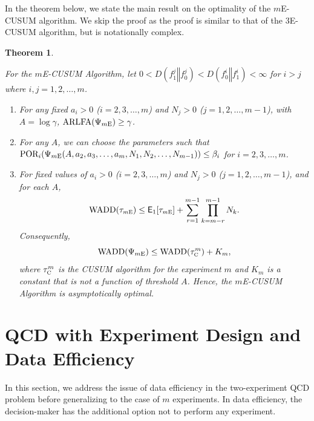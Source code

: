 \documentclass[journal, onecolumn]{IEEEtran}
\newtheorem{theorem}{Theorem}
\begin{document}
\medskip

In the theorem below, we state the main result on the optimality of the $m$E-CUSUM algorithm. We skip the proof as the proof is similar to that of the 3E-CUSUM algorithm, but is notationally complex. 

\begin{theorem}
\label{thm:me}

For the \textup{$m$E-CUSUM} Algorithm, let $0 < D(f_1^j \mathrel{\Vert} f_0^j) < D(f_0^i \mathrel{\Vert} f_1^i) < \infty$ for $i > j$ where $i, j = 1, 2, \dots, m$.

\begin{enumerate}
\item For any fixed $a_i > 0$ ($i = 2, 3, \dots, m$) and $N_j > 0$ ($j = 1, 2, \dots, m - 1$), with $A = \log \gamma$, $\textup{ARLFA} (\Psi_{\textup{$m$E}}) \geq \gamma$.

\item For any $A$, we can choose the parameters such that
$ \textup{POR}_i (\Psi_{\textup{$m$E}} (A, a_2, a_3, \dots, a_m, N_1, N_2, \dots, N_{m - 1})) \leq \beta_i $
for $i = 2, 3, \dots, m$.

\item For fixed values of $a_i > 0$ ($i = 2, 3, \dots, m$) and $N_j > 0$ ($j = 1, 2, \dots, m - 1$), and for each $A$,
$$ \textup{WADD} (\tau_{\textup{\fontsize{6 pt}{10 pt}\selectfont $m$E}}) \leq \mathsf{E}_1 [\tau_{\textup{\fontsize{6 pt}{10 pt}\selectfont $m$E}}] + \sum_{r = 1}^{m - 1} \prod_{k = m - r}^{m - 1} N_k. $$
Consequently,
$$ \textup{WADD} (\Psi_{\textup{$m$E}}) \leq \textup{WADD} (\tau_{\textup{\fontsize{6 pt}{10 pt}\selectfont C}}^m) + K_m, $$
where $\tau_{\textup{\fontsize{6 pt}{10 pt}\selectfont C}}^m$ is the \textup{CUSUM} algorithm for the experiment $m$ and $K_m$ is a constant that is not a function of threshold $A$. Hence, the \textup{$m$E-CUSUM} Algorithm is asymptotically optimal.
\end{enumerate}

\end{theorem}




\clearpage

\section{QCD with Experiment Design and Data Efficiency}
\label{sec:data-efficient}

In this section, we address the issue of data efficiency in the two-experiment QCD problem before generalizing to the case of $m$ experiments. In data efficiency, the decision-maker has the additional option not to perform any experiment.
\end{document}
